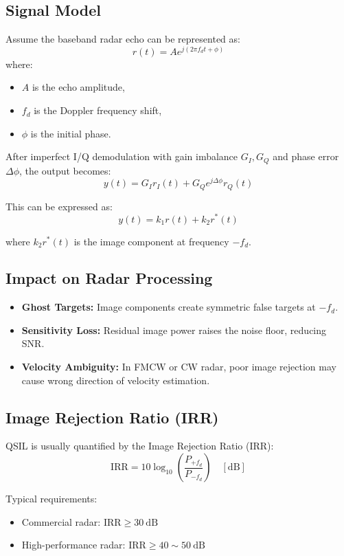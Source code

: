 \documentclass{article}
\begin{document}
\subsection{Signal Model}

Assume the baseband radar echo can be represented as:
\[
r(t) = A e^{j(2\pi f_d t + \phi)}
\]
where:
\begin{itemize}
    \item \(A\) is the echo amplitude,
    \item \(f_d\) is the Doppler frequency shift,
    \item \(\phi\) is the initial phase.
\end{itemize}

After imperfect I/Q demodulation with gain imbalance \(G_I, G_Q\) and phase error \(\Delta \phi\), the output becomes:
\[
y(t) = G_I r_I(t) + G_Q e^{j\Delta \phi} r_Q(t)
\]

This can be expressed as:
\[
y(t) = k_1 r(t) + k_2 r^*(t)
\]

where \(k_2 r^*(t)\) is the image component at frequency \(-f_d\).

\subsection{Impact on Radar Processing}

\begin{itemize}
    \item \textbf{Ghost Targets:} Image components create symmetric false targets at \(-f_d\).
    \item \textbf{Sensitivity Loss:} Residual image power raises the noise floor, reducing SNR.
    \item \textbf{Velocity Ambiguity:} In FMCW or CW radar, poor image rejection may cause wrong direction of velocity estimation.
\end{itemize}

\subsection{Image Rejection Ratio (IRR)}

QSIL is usually quantified by the Image Rejection Ratio (IRR):
\[
\mathrm{IRR} = 10 \log_{10} \!\left( \frac{P_{+f_d}}{P_{-f_d}} \right) \quad [\mathrm{dB}]
\]

Typical requirements:
\begin{itemize}
    \item Commercial radar: \( \mathrm{IRR} \geq 30 \ \mathrm{dB} \)
    \item High-performance radar: \( \mathrm{IRR} \geq 40 \sim 50 \ \mathrm{dB} \)
\end{itemize}
\end{document}
